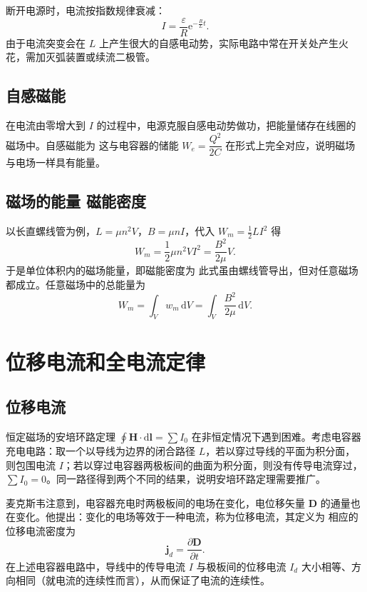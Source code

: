     断开电源时，电流按指数规律衰减：
    \[
    I=\frac{\varepsilon}{R}\mathrm{e}^{-\frac{R}{L}t}.
    \]
    由于电流突变会在 $L$ 上产生很大的自感电动势，实际电路中常在开关处产生火花，需加灭弧装置或续流二极管。

    \subsection{自感磁能}
    在电流由零增大到 $I$ 的过程中，电源克服自感电动势做功，把能量储存在线圈的磁场中。自感磁能为
    这与电容器的储能 $W_e=\dfrac{Q^{2}}{2C}$ 在形式上完全对应，说明磁场与电场一样具有能量。

    \subsection{磁场的能量 磁能密度}
    以长直螺线管为例，$L=\mu n^{2}V$，$B=\mu nI$，代入 $W_m=\frac{1}{2}LI^{2}$ 得
    \[
    W_m=\frac{1}{2}\mu n^{2}VI^{2}=\frac{B^{2}}{2\mu}V.
    \]
    于是单位体积内的磁场能量，即磁能密度为
    此式虽由螺线管导出，但对任意磁场都成立。任意磁场中的总能量为
    \[
    W_m=\int_Vw_m\,\mathrm{d}V=\int_V\frac{B^{2}}{2\mu}\,\mathrm{d}V.
    \]


\section{位移电流和全电流定律}
    \subsection{位移电流}
    恒定磁场的安培环路定理 $\oint\boldsymbol{H}\cdot\mathrm{d}\boldsymbol{l}=\sum I_0$ 在非恒定情况下遇到困难。考虑电容器充电电路：取一个以导线为边界的闭合路径 $L$，若以穿过导线的平面为积分面，则包围电流 $I$；若以穿过电容器两极板间的曲面为积分面，则没有传导电流穿过，$\sum I_0=0$。同一路径得到两个不同的结果，说明安培环路定理需要推广。

    麦克斯韦注意到，电容器充电时两极板间的电场在变化，电位移矢量 $\boldsymbol{D}$ 的通量也在变化。他提出：变化的电场等效于一种电流，称为位移电流，其定义为
    相应的位移电流密度为
    \[
    \boldsymbol{j}_d=\frac{\partial\boldsymbol{D}}{\partial t}.
    \]
    在上述电容器电路中，导线中的传导电流 $I$ 与极板间的位移电流 $I_d$ 大小相等、方向相同（就电流的连续性而言），从而保证了电流的连续性。

